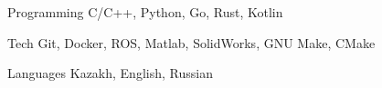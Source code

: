 

\begin{cvskills}

  \cvskill
    {Programming} %
    {C/C++, Python, Go, Rust, Kotlin} %

  \cvskill
    {Tech} %
    {Git, Docker, ROS, Matlab, SolidWorks, GNU Make, CMake } %

  \cvskill
    {Languages} %
    {Kazakh, English, Russian} %

\end{cvskills}
